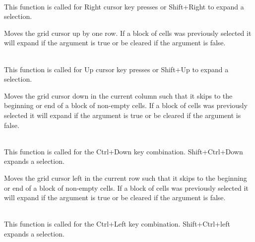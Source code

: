 \\
This function is called for Right cursor key presses or Shift+Right to expand a selection.



\label{wxgridmovecursorup}


Moves the grid cursor up by one row. If a block of cells was previously selected it
will expand if the argument is true or be cleared if the argument is false.

\\
This function is called for Up cursor key presses or Shift+Up to expand a selection.



\label{wxgridmovecursordownblock}


Moves the grid cursor down in the current column such that it skips to the beginning or
end of a block of non-empty cells. If a block of cells was previously selected it
will expand if the argument is true or be cleared if the argument is false.

\\
This function is called for the Ctrl+Down key combination. Shift+Ctrl+Down expands a selection.



\label{wxgridmovecursorleftblock}


Moves the grid cursor left in the current row such that it skips to the beginning or
end of a block of non-empty cells. If a block of cells was previously selected it
will expand if the argument is true or be cleared if the argument is false.

\\
This function is called for the Ctrl+Left key combination. Shift+Ctrl+left expands a selection.



\label{wxgridmovecursorrightblock}


